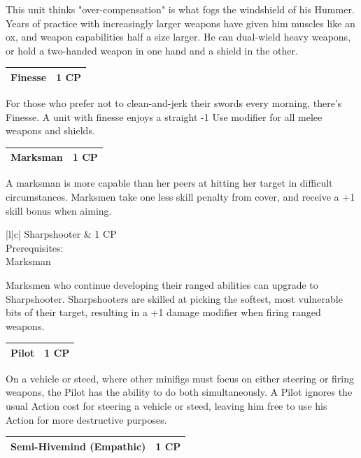\documentclass[12pt,a4paper,twocolumn]{article}
\begin{document}
This unit thinks "over-compensation" is what fogs the windshield of his Hummer.  Years of practice with increasingly larger weapons have given him muscles like an ox, and weapon capabilities half a size larger.  He can dual-wield heavy weapons, or hold a two-handed weapon in one hand and a shield in the other.

\begin{tabular}{|l|c|} \hline
Finesse & 1 CP \\ \hline
\end{tabular}

For those who prefer not to clean-and-jerk their swords every morning, there's Finesse.  A unit with finesse enjoys a straight -1 Use modifier for all melee weapons and shields.

\begin{tabular}{|l|c|} \hline
Marksman & 1 CP \\ \hline
\end{tabular}

A marksman is more capable than her peers at hitting her target in difficult circumstances.  Marksmen take one less skill penalty from cover, and receive a +1 skill bonus when aiming.

\begin{tabular}{|l|c|} \hline
Sharpshooter & 1 CP \\ \hline
{} {Prerequisites: } \\
 {Marksman } \\ \hline
\end{tabular}

Marksmen who continue developing their ranged abilities can upgrade to Sharpshooter.  Sharpshooters are skilled at picking the softest, most vulnerable bits of their target, resulting in a +1 damage modifier when firing ranged weapons.

\begin{tabular}{|l|c|} \hline
Pilot & 1 CP \\ \hline
\end{tabular}

On a vehicle or steed, where other minifigs must focus on either steering or firing weapons, the Pilot has the ability to do both simultaneously.  A Pilot ignores the usual Action cost for steering a vehicle or steed, leaving him free to use his Action for more destructive purposes.


\begin{tabular}{|l|c|} \hline
Semi-Hivemind (Empathic) & 1 CP \\ \hline
\end{tabular}
\end{document}
